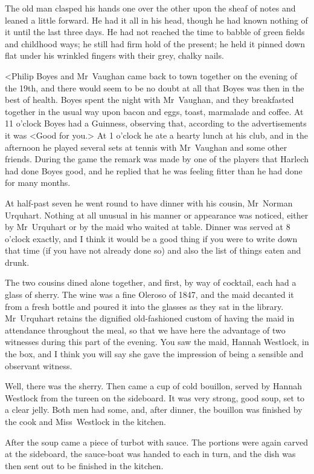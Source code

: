 The old man clasped his hands one over the other upon the sheaf of notes and leaned a little forward. He had it all in his head, though he had known nothing of it until the last three days. He had not reached the time to babble of green fields and childhood ways; he still had firm hold of the present; he held it pinned down flat under his wrinkled fingers with their grey, chalky nails.

<Philip Boyes and Mr~Vaughan came back to town together on the evening of the 19th, and there would seem to be no doubt at all that Boyes was then in the best of health. Boyes spent the night with Mr~Vaughan, and they breakfasted together in the usual way upon bacon and eggs, toast, marmalade and coffee. At 11 o'clock Boyes had a Guinness, observing that, according to the advertisements it was <Good for you.> At 1 o'clock he ate a hearty lunch at his club, and in the afternoon he played several sets at tennis with Mr~Vaughan and some other friends. During the game the remark was made by one of the players that Harlech had done Boyes good, and he replied that he was feeling fitter than he had done for many months.

At half-past seven he went round to have dinner with his cousin, Mr~Norman Urquhart. Nothing at all unusual in his manner or appearance was noticed, either by Mr~Urquhart or by the maid who waited at table. Dinner was served at 8 o'clock exactly, and I think it would be a good thing if you were to write down that time (if you have not already done so) and also the list of things eaten and drunk.

The two cousins dined alone together, and first, by way of cocktail, each had a glass of sherry. The wine was a fine Oleroso of 1847, and the maid decanted it from a fresh bottle and poured it into the glasses as they sat in the library. Mr~Urquhart retains the dignified old-fashioned custom of having the maid in attendance throughout the meal, so that we have here the advantage of two witnesses during this part of the evening. You saw the maid, Hannah Westlock, in the box, and I think you will say she gave the impression of being a sensible and observant witness.

Well, there was the sherry. Then came a cup of cold bouillon, served by Hannah Westlock from the tureen on the sideboard. It was very strong, good soup, set to a clear jelly. Both men had some, and, after dinner, the bouillon was finished by the cook and Miss~Westlock in the kitchen.

After the soup came a piece of turbot with sauce. The portions were again carved at the sideboard, the sauce-boat was handed to each in turn, and the dish was then sent out to be finished in the kitchen.

